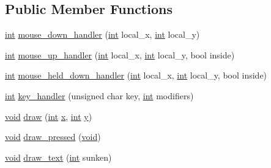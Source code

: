 \subsection*{Public Member Functions}
\begin{DoxyCompactItemize}
\item 
\hyperlink{wglext_8h_a500a82aecba06f4550f6849b8099ca21}{int} \hyperlink{class_g_l_u_i___button_ad049e31e22fddf61df229c6fcef80f27}{mouse\+\_\+down\+\_\+handler} (\hyperlink{wglext_8h_a500a82aecba06f4550f6849b8099ca21}{int} local\+\_\+x, \hyperlink{wglext_8h_a500a82aecba06f4550f6849b8099ca21}{int} local\+\_\+y)
\item 
\hyperlink{wglext_8h_a500a82aecba06f4550f6849b8099ca21}{int} \hyperlink{class_g_l_u_i___button_a731c78e9ae9fe92fe5e0eba47fc6c0cf}{mouse\+\_\+up\+\_\+handler} (\hyperlink{wglext_8h_a500a82aecba06f4550f6849b8099ca21}{int} local\+\_\+x, \hyperlink{wglext_8h_a500a82aecba06f4550f6849b8099ca21}{int} local\+\_\+y, bool inside)
\item 
\hyperlink{wglext_8h_a500a82aecba06f4550f6849b8099ca21}{int} \hyperlink{class_g_l_u_i___button_a38e99372cc0de31dfa784b95e70d1f51}{mouse\+\_\+held\+\_\+down\+\_\+handler} (\hyperlink{wglext_8h_a500a82aecba06f4550f6849b8099ca21}{int} local\+\_\+x, \hyperlink{wglext_8h_a500a82aecba06f4550f6849b8099ca21}{int} local\+\_\+y, bool inside)
\item 
\hyperlink{wglext_8h_a500a82aecba06f4550f6849b8099ca21}{int} \hyperlink{class_g_l_u_i___button_abb99757083838d0f9c87596b512ec5e9}{key\+\_\+handler} (unsigned char key, \hyperlink{wglext_8h_a500a82aecba06f4550f6849b8099ca21}{int} modifiers)
\item 
\hyperlink{wglext_8h_a9e6b7f1933461ef318bb000d6bd13b83}{void} \hyperlink{class_g_l_u_i___button_a0b70efaf00fe4eeb26f2675c156fc48f}{draw} (\hyperlink{wglext_8h_a500a82aecba06f4550f6849b8099ca21}{int} \hyperlink{glext_8h_ad77deca22f617d3f0e0eb786445689fc}{x}, \hyperlink{wglext_8h_a500a82aecba06f4550f6849b8099ca21}{int} \hyperlink{glext_8h_a9298c7ad619074f5285b32c6b72bfdea}{y})
\item 
\hyperlink{wglext_8h_a9e6b7f1933461ef318bb000d6bd13b83}{void} \hyperlink{class_g_l_u_i___button_a445e459227bf0019217ec05e064d3f67}{draw\+\_\+pressed} (\hyperlink{wglext_8h_a9e6b7f1933461ef318bb000d6bd13b83}{void})
\item 
\hyperlink{wglext_8h_a9e6b7f1933461ef318bb000d6bd13b83}{void} \hyperlink{class_g_l_u_i___button_a3012a081189288aa6190258f6fd47c9c}{draw\+\_\+text} (\hyperlink{wglext_8h_a500a82aecba06f4550f6849b8099ca21}{int} sunken)

\end{DoxyCompactItemize}
